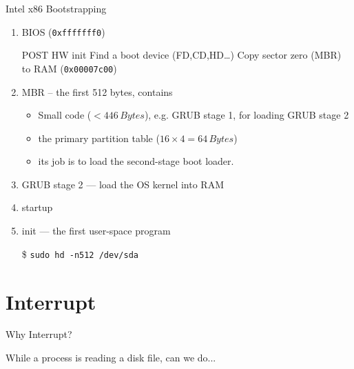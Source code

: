 \begin{frame}{Intel x86 Bootstrapping}
  \begin{enumerate}
  \item BIOS (\texttt{0xfffffff0})\\
    \begin{small}
      {} POST\quad
      {} HW init\quad
      {} Find a boot device (FD,CD,HD\ldots{})\quad
      {} Copy \alert{sector zero (MBR)} to RAM (\texttt{0x00007c00})
    \end{small}
  \item MBR -- the first 512 bytes, contains
    \begin{itemize}
    \item Small code ($< 446\,Bytes$), e.g. GRUB stage 1, for loading GRUB stage 2
    \item the primary partition table ($16\times{}4=64\,Bytes$)
    \item its job is to load the second-stage boot loader.
    \end{itemize}
  \item GRUB stage 2 --- load the OS kernel into RAM
  \item {\linux} startup
  \item init --- the first user-space program
  \end{enumerate}
  \begin{center}
  \end{center}
  \begin{itemize}
  \item[\$] \texttt{sudo hd -n512 /dev/sda}
  \end{itemize}
\end{frame}

\section{Interrupt}
\label{sec:interrupt}


\begin{frame}{Why Interrupt?}
  \begin{iblock}{While a process is reading a disk file, can we do...}
    \begin{center}
    \end{center}
  \end{iblock}
\end{frame}

